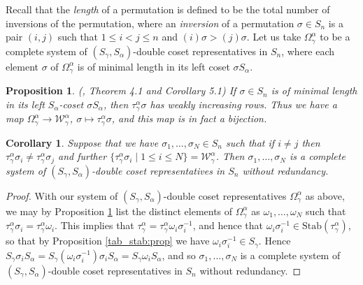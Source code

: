 \documentclass[10pt]{article}
\newtheorem{prop}[theorem]{Proposition}
\newtheorem{coro}[theorem]{Corollary}
\theoremstyle{definition}
\begin{document}
Recall that the \textit{length} of a permutation is defined to be the total number of inversions of the permutation, where an
\textit{inversion} of a permutation $\sigma \in S_n$ is a pair $(i,j)$ such that $1 \leq i < j \leq n$ and $(i)\sigma > (j)\sigma$.
Let us take $\Omega^\alpha_{\gamma}$ to be a complete system of $(S_\gamma,S_\alpha)$-double coset representatives in $S_n$, where each element
$\sigma$ of $\Omega^\alpha_\gamma$ is of minimal length in its left coset $\sigma S_\alpha$.

\begin{prop}\label{tab_dcos_bij:prop}\textup{(}\cite{WLDDCR}, Theorem 4.1 and Corollary 5.1\textup{)}
If $\sigma \in S_n$ is of minimal length in its left $S_\alpha$-coset $\sigma S_\alpha$, then $\tau^\alpha_{\gamma}\sigma$ has
weakly increasing rows. Thus we have a map
$\Omega^\alpha_\gamma \longrightarrow \mathcal{W}^\alpha_\gamma$, $\sigma \longmapsto \tau^\alpha_\gamma\sigma$, and this map is in fact a
bijection.
\end{prop}

\begin{coro}\label{tabs_give_cosets:cor}
Suppose that we have $\sigma_1,\ldots,\sigma_N \in S_n$ such that if $i \neq j$ then
$\tau^\alpha_\gamma\sigma_i \neq \tau^\alpha_\gamma\sigma_j$ and further $\{\tau^\alpha_\gamma\sigma_i \mid 1 \leqslant i \leqslant N\} =
\mathcal{W}^\alpha_\gamma$. Then $\sigma_1,\ldots,\sigma_N$ is a complete system of $(S_\gamma,S_\alpha)$-double coset representatives in
$S_n$ without redundancy.
\end{coro}
\begin{proof}
With our system of $(S_\gamma,S_\alpha)$-double coset representatives $\Omega^\alpha_{\gamma}$ as above, we may by Proposition
\ref{tab_dcos_bij:prop} list the distinct elements of $\Omega^\alpha_{\gamma}$ as $\omega_1,\ldots,\omega_N$ such that
$\tau^\alpha_\gamma\sigma_i = \tau^\alpha_\gamma\omega_i$. This implies that $\tau^\alpha_\gamma = \tau^\alpha_\gamma\omega_i\sigma_i^{-1}$, and
hence that $\omega_i\sigma_i^{-1} \in \mathrm{Stab}(\tau^\alpha_\gamma)$, so that by Proposition \ref{tab_stab:prop} we have
$\omega_i\sigma_i^{-1} \in S_\gamma$. Hence $S_\gamma \sigma_i S_\alpha = S_\gamma (\omega_i\sigma_i^{-1}) \sigma_i S_\alpha =
S_\gamma \omega_i S_\alpha$, and so $\sigma_1,\ldots,\sigma_N$ is a complete system of $(S_\gamma,S_\alpha)$-double coset representatives in
$S_n$ without redundancy.
\end{proof}
\end{document}
